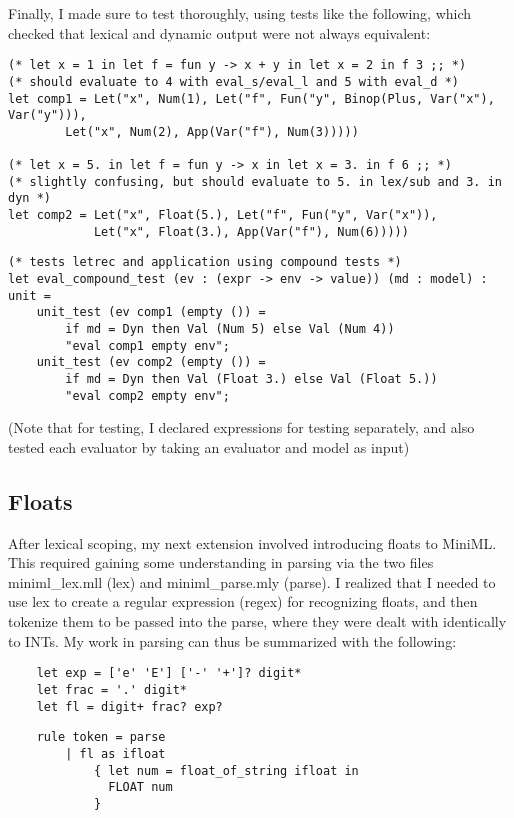 \documentclass{article}
\begin{document}
\pagebreak
Finally, I made sure to test thoroughly, using tests like the following, which checked that lexical and dynamic output were not always equivalent:
\begin{verbatim}
(* let x = 1 in let f = fun y -> x + y in let x = 2 in f 3 ;; *)
(* should evaluate to 4 with eval_s/eval_l and 5 with eval_d *)
let comp1 = Let("x", Num(1), Let("f", Fun("y", Binop(Plus, Var("x"), Var("y"))), 
        Let("x", Num(2), App(Var("f"), Num(3)))))

(* let x = 5. in let f = fun y -> x in let x = 3. in f 6 ;; *)
(* slightly confusing, but should evaluate to 5. in lex/sub and 3. in dyn *)
let comp2 = Let("x", Float(5.), Let("f", Fun("y", Var("x")), 
            Let("x", Float(3.), App(Var("f"), Num(6)))))
\end{verbatim}
\begin{verbatim}
(* tests letrec and application using compound tests *)
let eval_compound_test (ev : (expr -> env -> value)) (md : model) : unit =
    unit_test (ev comp1 (empty ()) = 
	    if md = Dyn then Val (Num 5) else Val (Num 4))
	    "eval comp1 empty env";
    unit_test (ev comp2 (empty ()) = 
	    if md = Dyn then Val (Float 3.) else Val (Float 5.))
	    "eval comp2 empty env";
\end{verbatim}
(Note that for testing, I declared expressions for testing separately, and also tested each evaluator by taking an evaluator and model as input)
\pagebreak

\subsection*{Floats}
After lexical scoping, my next extension involved introducing floats to MiniML. This required gaining some understanding in parsing via the two files miniml\_lex.mll (lex) and miniml\_parse.mly (parse). I realized that I needed to use lex to create a regular expression (regex) for recognizing floats, and then tokenize them to be passed into the parse, where they were dealt with identically to INTs. My work in parsing can thus be summarized with the following: 
\begin{verbatim}
    let exp = ['e' 'E'] ['-' '+']? digit*
    let frac = '.' digit*
    let fl = digit+ frac? exp?
\end{verbatim}
\begin{verbatim}
    rule token = parse
        | fl as ifloat
            { let num = float_of_string ifloat in
              FLOAT num
            }
\end{verbatim}
\end{document}
